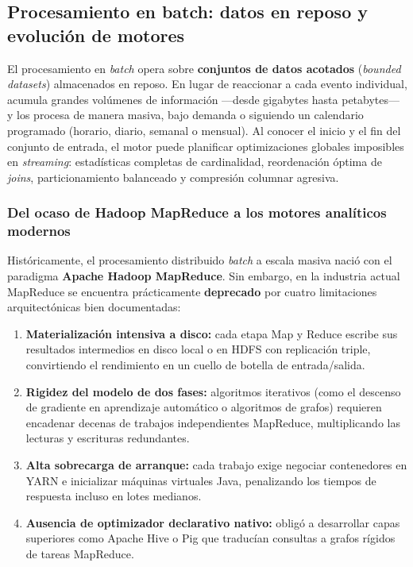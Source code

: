 \subsection{Procesamiento en batch: datos en reposo y evolución de motores}\label{subsec:batch}

El procesamiento en \textit{batch} opera sobre \textbf{conjuntos de datos acotados} (\textit{bounded datasets}) almacenados en reposo. En lugar de reaccionar a cada evento individual, acumula grandes volúmenes de información ---desde gigabytes hasta petabytes--- y los procesa de manera masiva, bajo demanda o siguiendo un calendario programado (horario, diario, semanal o mensual). Al conocer el inicio y el fin del conjunto de entrada, el motor puede planificar optimizaciones globales imposibles en \textit{streaming}: estadísticas completas de cardinalidad, reordenación óptima de \textit{joins}, particionamiento balanceado y compresión columnar agresiva.

\subsubsection{Del ocaso de Hadoop MapReduce a los motores analíticos modernos}

Históricamente, el procesamiento distribuido \textit{batch} a escala masiva nació con el paradigma \textbf{Apache Hadoop MapReduce}. Sin embargo, en la industria actual MapReduce se encuentra prácticamente \textbf{deprecado}  por cuatro limitaciones arquitectónicas bien documentadas:
\begin{enumerate}
  \item \textbf{Materialización intensiva a disco:} cada etapa Map y Reduce escribe sus resultados intermedios en disco local o en HDFS con replicación triple, convirtiendo el rendimiento en un cuello de botella de entrada/salida.
  \item \textbf{Rigidez del modelo de dos fases:} algoritmos iterativos (como el descenso de gradiente en aprendizaje automático o algoritmos de grafos) requieren encadenar decenas de trabajos independientes MapReduce, multiplicando las lecturas y escrituras redundantes.
  \item \textbf{Alta sobrecarga de arranque:} cada trabajo exige negociar contenedores en YARN e inicializar máquinas virtuales Java, penalizando los tiempos de respuesta incluso en lotes medianos.
  \item \textbf{Ausencia de optimizador declarativo nativo:} obligó a desarrollar capas superiores como Apache Hive o Pig que traducían consultas a grafos rígidos de tareas MapReduce.
\end{enumerate}


